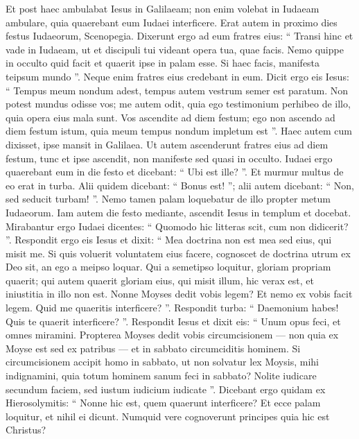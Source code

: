 \begin{biblechapter}
\begin{biblechapter}
\begin{biblechapter}
\begin{biblechapter}
\begin{biblechapter}
\begin{biblechapter}
\begin{biblechapter}
\verse Et post haec ambulabat Iesus in Galilaeam; non enim volebat in Iudaeam ambulare, quia quaerebant eum Iudaei interficere.
 \verse Erat autem in proximo dies festus Iudaeorum, Scenopegia. 
\verse Dixerunt ergo ad eum fratres eius: “ Transi hinc et vade in Iudaeam, ut et discipuli tui videant opera tua, quae facis. 
\verse Nemo quippe in occulto quid facit et quaerit ipse in palam esse. Si haec facis, manifesta teipsum mundo ”. 
\verse Neque enim fratres eius credebant in eum. 
\verse Dicit ergo eis Iesus: “ Tempus meum nondum adest, tempus autem vestrum semer est paratum. 
\verse Non potest mundus odisse vos; me autem odit, quia ego testimonium perhibeo de illo, quia opera eius mala sunt. 
\verse Vos ascendite ad diem festum; ego non ascendo ad diem festum istum, quia meum tempus nondum impletum est ”. 
\verse Haec autem cum dixisset, ipse mansit in Galilaea.
 \verse Ut autem ascenderunt fratres eius ad diem festum, tunc et ipse ascendit, non manifeste sed quasi in occulto. 
\verse Iudaei ergo quaerebant eum in die festo et dicebant: “ Ubi est ille? ”. 
\verse Et murmur multus de eo erat in turba. Alii quidem dicebant: “ Bonus est! ”; alii autem dicebant: “ Non, sed seducit turbam! ”. 
\verse Nemo tamen palam loquebatur de illo propter metum Iudaeorum.
 \verse Iam autem die festo mediante, ascendit Iesus in templum et docebat. 
\verse Mirabantur ergo Iudaei dicentes: “ Quomodo hic litteras scit, cum non didicerit? ”. 
\verse Respondit ergo eis Iesus et dixit: “ Mea doctrina non est mea sed eius, qui misit me. 
\verse Si quis voluerit voluntatem eius facere, cognoscet de doctrina utrum ex Deo sit, an ego a meipso loquar. 
\verse Qui a semetipso loquitur, gloriam propriam quaerit; qui autem quaerit gloriam eius, qui misit illum, hic verax est, et iniustitia in illo non est. 
\verse Nonne Moyses dedit vobis legem? Et nemo ex vobis facit legem. Quid me quaeritis interficere? ”. 
 \verse Respondit turba: “ Daemonium habes! Quis te quaerit interficere? ”. 
\verse Respondit Iesus et dixit eis: “ Unum opus feci, et omnes miramini. 
\verse Propterea Moyses dedit vobis circumcisionem — non quia ex Moyse est sed ex patribus — et in sabbato circumciditis hominem. 
\verse Si circumcisionem accipit homo in sabbato, ut non solvatur lex Moysis, mihi indignamini, quia totum hominem sanum feci in sabbato? 
\verse Nolite iudicare secundum faciem, sed iustum iudicium iudicate ”.
 \verse Dicebant ergo quidam ex Hierosolymitis: “ Nonne hic est, quem quaerunt interficere? 
\verse Et ecce palam loquitur, et nihil ei dicunt. Numquid vere cognoverunt principes quia hic est Christus? 

\end{biblechapter}
\end{biblechapter}
\end{biblechapter}
\end{biblechapter}
\end{biblechapter}
\end{biblechapter}
\end{biblechapter}
